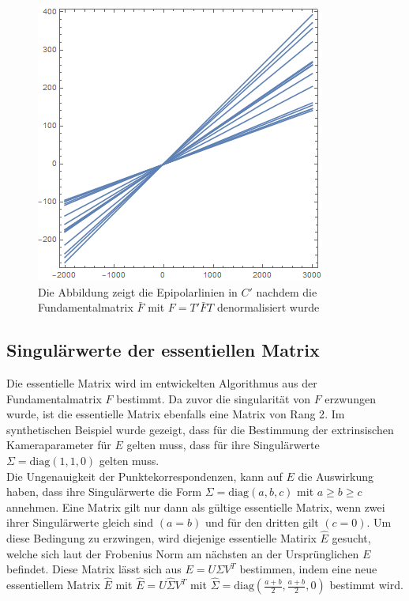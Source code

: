 \begin{figure}[!htb]
	\includegraphics[width=\linewidth]{images/LPrime_PC2_F_Constraint_denormalized.png}
	\caption[Epipolarlinien in $C$ aus singulärer denormalisierter Fundamentalmatrix]{Die Abbildung zeigt die Epipolarlinien in $C'$ nachdem die Fundamentalmatrix $\bar{F}$ mit $F = T'\bar{F}T$ denormalisiert wurde}
	\label{fig:EpipoleWithF2Denorm}
	\endminipage\hfill
\end{figure}

\pagebreak

\subsection{Singulärwerte der essentiellen Matrix}

Die essentielle Matrix wird im entwickelten Algorithmus aus der Fundamentalmatrix $F$ bestimmt. Da zuvor die singularität von $F$ erzwungen wurde, ist die essentielle Matrix ebenfalls eine Matrix von Rang 2\cite{HZ}. Im synthetischen Beispiel wurde gezeigt, dass für die Bestimmung der extrinsischen Kameraparameter für $E$ gelten muss, dass für ihre Singulärwerte $\Sigma = \text{diag}(1,1,0)$ gelten muss. \\

Die Ungenauigkeit der Punktekorrespondenzen, kann auf $E$ die Auswirkung haben, dass ihre Singulärwerte die Form $\Sigma = \text{diag}(a,b,c)$ mit $a \geq b \geq c$ annehmen. Eine Matrix gilt nur dann als gültige essentielle Matrix, wenn zwei ihrer Singulärwerte gleich sind $(a = b)$ und für den dritten gilt $(c=0)$. Um diese Bedingung zu erzwingen, wird diejenige essentielle Matirix $\hat{E}$ gesucht, welche sich laut der Frobenius Norm am nächsten an der Ursprünglichen $E$ befindet\cite{HZ,Ferid}. Diese Matrix lässt sich aus $E = U \Sigma V^T$ bestimmen, indem eine neue essentiellem Matrix $\hat{E}$ mit $\hat{E} = U \hat{\Sigma}V^T$ mit $\hat{\Sigma} = \text{diag}(\frac{a+b}{2},\frac{a+b}{2},0)$\cite{HZ} bestimmt wird.\\

